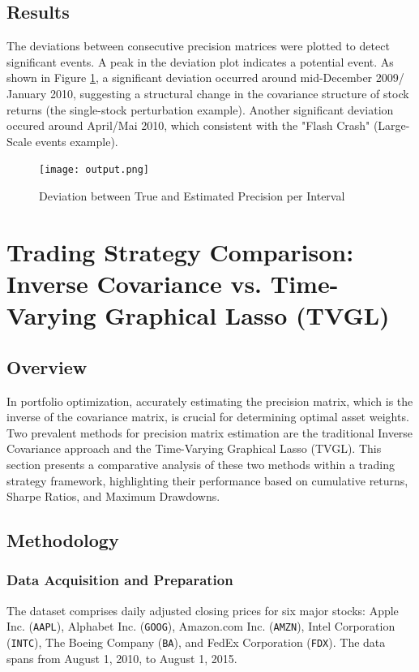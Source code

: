 \documentclass{article}
\begin{document}
\subsection{Results}
The deviations between consecutive precision matrices were plotted to detect significant events. A peak in the deviation plot indicates a potential event. As shown in Figure \ref{fig:deviation}, a significant deviation occurred around mid-December 2009/ January 2010, suggesting a structural change in the covariance structure of stock returns (the single-stock perturbation example). Another significant deviation occured around April/Mai 2010, which consistent with the "Flash Crash" (Large-Scale events example).

\begin{figure}[h!]
    \centering
    \texttt{[image: output.png]}
    \caption{Deviation between True and Estimated Precision per Interval}
    \label{fig:deviation}
\end{figure}


\section{Trading Strategy Comparison: Inverse Covariance vs. Time-Varying Graphical Lasso (TVGL)}

\subsection{Overview}

In portfolio optimization, accurately estimating the precision matrix, which is the inverse of the covariance matrix, is crucial for determining optimal asset weights. Two prevalent methods for precision matrix estimation are the traditional Inverse Covariance approach and the Time-Varying Graphical Lasso (TVGL). This section presents a comparative analysis of these two methods within a trading strategy framework, highlighting their performance based on cumulative returns, Sharpe Ratios, and Maximum Drawdowns.

\subsection{Methodology}

\subsubsection{Data Acquisition and Preparation}

The dataset comprises daily adjusted closing prices for six major stocks: Apple Inc. (\texttt{AAPL}), Alphabet Inc. (\texttt{GOOG}), Amazon.com Inc. (\texttt{AMZN}), Intel Corporation (\texttt{INTC}), The Boeing Company (\texttt{BA}), and FedEx Corporation (\texttt{FDX}). The data spans from August 1, 2010, to August 1, 2015.
\end{document}
